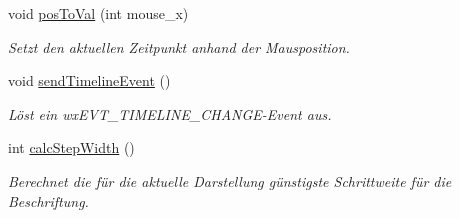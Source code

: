 \begin{DoxyCompactItemize}
void \hyperlink{classGUITimeline_a2cd5cc2f150a7ca94a4cddbb88843b21}{pos\-To\-Val} (int mouse\-\_\-x)
\begin{DoxyCompactList}\small\item\em Setzt den aktuellen Zeitpunkt anhand der Mausposition. \end{DoxyCompactList}\item 
void \hyperlink{classGUITimeline_a417835c7c520d9fbcf65610d255245a1}{send\-Timeline\-Event} ()
\begin{DoxyCompactList}\small\item\em Löst ein wx\-E\-V\-T\-\_\-\-T\-I\-M\-E\-L\-I\-N\-E\-\_\-\-C\-H\-A\-N\-G\-E-\/\-Event aus. \end{DoxyCompactList}\item 
int \hyperlink{classGUITimeline_a98e636407ed0691d655eaa53cd0d968c}{calc\-Step\-Width} ()
\begin{DoxyCompactList}\small\item\em Berechnet die für die aktuelle Darstellung günstigste Schrittweite für die Beschriftung. \end{DoxyCompactList}\end{DoxyCompactItemize}
